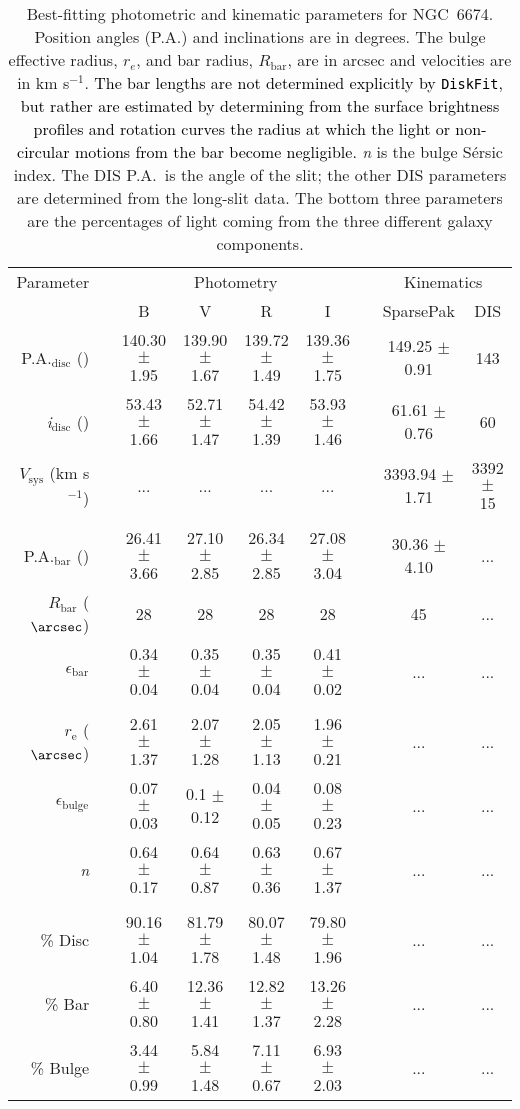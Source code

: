 \documentclass[a4paper,fleqn,usenatbib]{mnras}
\newcommand{\authorfix}{\textcolor{black}}
\begin{document}
\begin{table*}
	\centering
	\caption{Best-fitting photometric and kinematic parameters for NGC~6674. Position angles (P.A.) and inclinations are in degrees. The bulge effective radius, $r_{e}$, and bar radius, $R_{\mathrm{bar}}$, are in arcsec and velocities are in km s$^{-1}$. \authorfix{The bar lengths are not determined explicitly by \texttt{DiskFit}, but rather are estimated by determining from the surface brightness profiles and rotation curves the radius at which the light or non-circular motions from the bar become negligible.} \textit{n} is the bulge S\'{e}rsic index. The DIS P.A.\ is the angle of the slit; the other DIS parameters are determined from the long-slit data. The bottom three parameters are the percentages of light coming from the three different galaxy components.}
	\label{6674_table}
	\begin{tabular}{rcccccccc}
		\hline
		Parameter		&		&\multicolumn{4}{c}{Photometry}		&		&\multicolumn{2}{c}{Kinematics}\\
							\cline{3-6}									\cline{8-9}
					&		&B		&V		&R		&I		&		& SparsePak		&DIS\\
		\hline
	P.A.$_{\mathrm{disc}}$ (\degr) & & 140.30 $\pm$ 1.95 & 139.90 $\pm$ 1.67 & 139.72 $\pm$ 1.49 & 139.36 $\pm$ 1.75 & & 149.25 $\pm$ 0.91 & 143  \\
	\textit{i}$_{\mathrm{disc}}$ (\degr)& & 53.43 $\pm$ 1.66 & 52.71 $\pm$ 1.47 & 54.42 $\pm$ 1.39 & 53.93 $\pm$ 1.46 & & 61.61 $\pm$ 0.76 & 60\\
	$V_{\mathrm{sys}}$ (km s$^{-1}$) & & ... & ... & ... & ... & & 3393.94 $\pm$ 1.71 & 3392 $\pm$ 15 \\
	\\
	P.A.$_{\mathrm{bar}}$ (\degr) & & 26.41 $\pm$ 3.66 & 27.10 $\pm$ 2.85 & 26.34 $\pm$ 2.85 & 27.08 $\pm$ 3.04 & & 30.36 $\pm$ 4.10 & ... \\
	$R_{\mathrm{bar}}$ ($\arcsec$) & & 28 & 28 & 28 & 28 & & 45 & ... \\
	$\epsilon_{\mathrm{bar}}$ & & 0.34 $\pm$ 0.04 & 0.35 $\pm$ 0.04 & 0.35 $\pm$ 0.04 & 0.41 $\pm$ 0.02 & & ... & ... \\
	\\
	$r_{\mathrm{e}}$ ($\arcsec$) & & 2.61 $\pm$ 1.37 & 2.07 $\pm$ 1.28 & 2.05 $\pm$ 1.13 & 1.96 $\pm$ 0.21 & & ... & ... \\
	$\epsilon_{\mathrm{bulge}}$ & & 0.07 $\pm$ 0.03 & 0.1 $\pm$ 0.12 & 0.04 $\pm$ 0.05 & 0.08 $\pm$ 0.23 & & ... & ... \\
	\textit{n} & & 0.64 $\pm$ 0.17 & 0.64 $\pm$ 0.87 & 0.63 $\pm$ 0.36 & 0.67 $\pm$ 1.37 & & ... & ... \\
	\\
	\% Disc & & 90.16 $\pm$ 1.04 & 81.79 $\pm$ 1.78 & 80.07 $\pm$ 1.48 & 79.80 $\pm$ 1.96 & & ... & ... \\
	\% Bar & & 6.40 $\pm$ 0.80 & 12.36 $\pm$ 1.41 & 12.82 $\pm$ 1.37 & 13.26 $\pm$ 2.28 & &... & ... \\
	\% Bulge & & 3.44 $\pm$ 0.99 & 5.84 $\pm$ 1.48 & 7.11 $\pm$ 0.67 & 6.93 $\pm$ 2.03 & & ... & ... \\
	\hline
	\end{tabular}
\end{table*}
\end{document}
